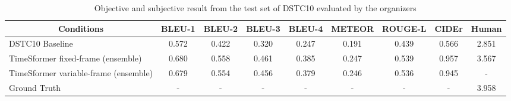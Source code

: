 \documentclass[letterpaper]{article} %
\begin{document}
\begin{table}[t]
  \centering
  \small
  \caption{Objective and subjective result from the test set of DSTC10 evaluated by the organizers}
  \label{tab:dstc10_result}
  \begin{tabular}{l|cccccccc}\hline
    \multicolumn{1}{c|}{Conditions} & BLEU-1 & BLEU-2 & BLEU-3 & BLEU-4 & METEOR & ROUGE-L & CIDEr & Human \\ \hline
    DSTC10 Baseline~\cite{Shah2021audio} & 0.572 & 0.422 & 0.320 & 0.247 & 0.191 & 0.439 & 0.566 & 2.851 \\
    TimeSformer fixed-frame (ensemble) & 0.680 & 0.558 & 0.461 & 0.385 & 0.247 & 0.539 & 0.957 & 3.567 \\
    TimeSformer variable-frame (ensemble) & 0.679 & 0.554 & 0.456 & 0.379 & 0.246 & 0.536 & 0.945 & - \\ 
    Ground Truth & - & - & - & - & - & - & - & 3.958 \\ \hline
  \end{tabular}
\end{table}
\end{document}
